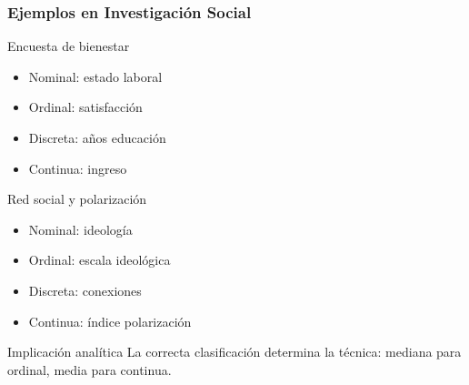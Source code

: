 \documentclass[aspectratio=169,11pt]{beamer}
\begin{document}
\begin{frame}[fragile]
\frametitle{Ejemplos en Investigación Social}
\tiny

\begin{block}{Encuesta de bienestar}
  \begin{itemize}
    \item Nominal: estado laboral
    \item Ordinal: satisfacción
    \item Discreta: años educación
    \item Continua: ingreso
  \end{itemize}
\end{block}

\pause

\begin{block}{Red social y polarización}
  \begin{itemize}
    \item Nominal: ideología
    \item Ordinal: escala ideológica
    \item Discreta: conexiones
    \item Continua: índice polarización
  \end{itemize}
\end{block}

\pause

\begin{alertblock}{Implicación analítica}
  La correcta clasificación determina la técnica: mediana para ordinal, media para continua.
\end{alertblock}
\end{frame}
\end{document}
